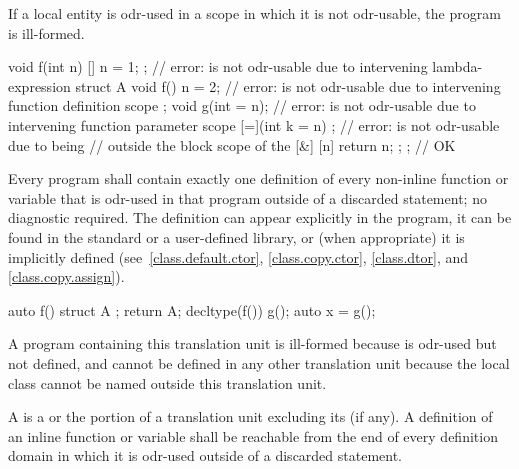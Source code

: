 If a local entity is odr-used
in a scope in which it is not odr-usable,
the program is ill-formed.
\begin{example}
\begin{codeblock}
void f(int n) {
  [] { n = 1; };                // error:  is not odr-usable due to intervening lambda-expression
  struct A {
    void f() { n = 2; }         // error:  is not odr-usable due to intervening function definition scope
  };
  void g(int = n);              // error:  is not odr-usable due to intervening function parameter scope
  [=](int k = n) {};            // error:  is not odr-usable due to being
                                // outside the block scope of the 
  [&] { [n]{ return n; }; };    // OK
}
\end{codeblock}
\end{example}

\pnum
Every program shall contain exactly one definition of every non-inline
function or variable that is odr-used in that program
outside of a discarded statement; no diagnostic required.
The definition can appear explicitly in the program, it can be found in
the standard or a user-defined library, or (when appropriate) it is
implicitly defined (see~\ref{class.default.ctor}, \ref{class.copy.ctor},
\ref{class.dtor}, and \ref{class.copy.assign}).
\begin{example}
\begin{codeblock}
auto f() {
  struct A {};
  return A{};
}
decltype(f()) g();
auto x = g();
\end{codeblock}
A program containing this translation unit is ill-formed
because  is odr-used but not defined,
and cannot be defined in any other translation unit
because the local class  cannot be named outside this
translation unit.
\end{example}

\pnum
A  is
a  or
the portion of a translation unit
excluding its  (if any).
A definition of an inline function or variable shall be reachable
from the end of every definition domain
in which it is odr-used outside of a discarded statement.

